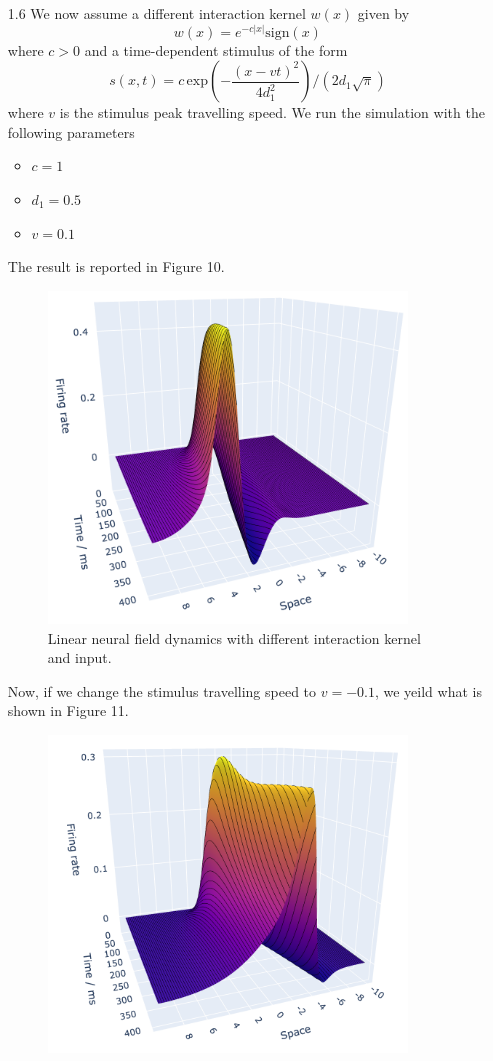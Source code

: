 \documentclass[12pt]{article}
\begin{document}
\begin{enumerate}
\[\]
\item[1.6] We now assume a different interaction kernel $w(x)$ given by
\[
    w(x) = e^{-c|x|}\text{sign}(x)  
\] 
where $c>0$ and a time-dependent stimulus of the form
\[
    s(x, t) = c\,\text{exp}\left(-\frac{(x-vt)^{2}}{4d_{1}^{2}}\right)/(2d_{1}\sqrt{\pi})
\]
where $v$ is the stimulus peak travelling speed. We run the simulation with the following parameters
\begin{itemize}
    \item $c=1$
    \item $d_{1}=0.5$
    \item $v=0.1$
\end{itemize}
The result is reported in Figure 10.
\begin{figure}[H]
    \centering
    \includegraphics[width=0.9\textwidth]{./figure10.png}
    \caption{Linear neural field dynamics with different interaction kernel and input.}
\end{figure}
Now, if we change the stimulus travelling speed to $v=-0.1$, we yeild what is shown in Figure 11.
\begin{figure}[H]
    \centering
    \includegraphics[width=0.9\textwidth]{./figure11.png}

\end{figure}
\end{enumerate}
\end{document}
